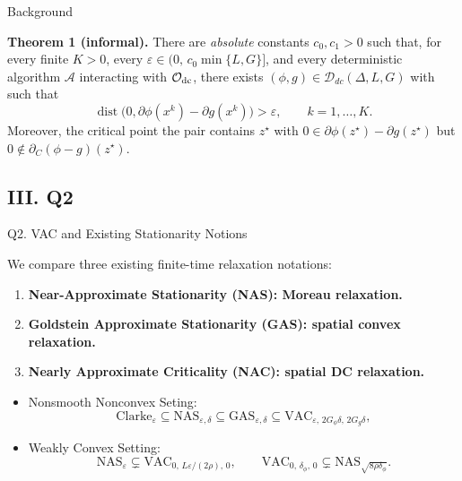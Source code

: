 \documentclass[10pt]{beamer}
\begin{document}
\begin{frame}{Background}
\small

\medskip
\textbf{Theorem 1 (informal).} There are \emph{absolute} constants $c_0,c_1>0$ such that, for every finite
$K > 0$, every $\varepsilon\in\bigl(0,\,c_0\min\{L,G\}\bigr]$, and every
deterministic algorithm $\mathcal A$ interacting with
$\mathcal O_{\rm dc}$, there exists $(\phi,g)\in\mathcal D_{dc}(\Delta,L,G)$
with  such that
$$
    \operatorname{dist}\!\bigl(0,\partial\phi(x^k)-\partial g(x^k)\bigr)
    >\varepsilon,\qquad k=1,\dots,K.
$$
Moreover, the critical point the pair contains $z^\star$ with
$0\in\partial\phi(z^\star)-\partial g(z^\star)$ but $0\notin\partial_C(\phi-g)(z^\star)$.
\end{frame}

\subsection{III. Q2}
\begin{frame}{Q2. VAC and Existing Stationarity Notions}
\small
\vspace{0.5cm}

\medskip
We compare three existing finite-time relaxation notations:
\begin{enumerate}\setlength{\itemsep}{5pt}

    \item \textbf{Near-Approximate Stationarity (NAS): Moreau relaxation.}
    
    \item \textbf{Goldstein Approximate Stationarity (GAS): spatial convex relaxation.}

    \item \textbf{Nearly Approximate Criticality (NAC): spatial DC relaxation.}
\end{enumerate}

\medskip
{}
\begin{itemize}
    \item Nonsmooth Nonconvex Seting:
    \[
\mathrm{Clarke}_{\varepsilon} \subseteq
\mathrm{NAS}_{\varepsilon,\delta}  \subseteq
\mathrm{GAS}_{\varepsilon,\delta}  \subseteq 
\mathrm{VAC}_{\varepsilon,\,2G_\phi\delta,\,2G_g\delta},
\]

\item Weakly Convex Setting:
\[
     \mathrm{NAS}_{\varepsilon}
    \subsetneq
    \mathrm{VAC}_{0,\,L\varepsilon/(2\rho),\,0},
    \qquad
   \mathrm{VAC}_{0,\,\delta_\phi,\,0}
    \subsetneq
   \mathrm{NAS}_{\sqrt{8\rho\delta_\phi}}.
\]
\end{itemize}

\end{frame}
\end{document}
